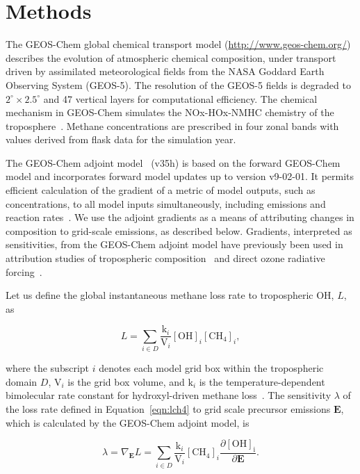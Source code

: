 \section{Methods}

The GEOS-Chem global chemical transport model (\url{http://www.geos-chem.org/}) describes the evolution of atmospheric chemical composition, under transport driven by assimilated meteorological fields from the NASA Goddard Earth Observing System (GEOS-5). The resolution of the GEOS-5 fields is degraded to $2^{\circ} \times 2.5^{\circ}$ and 47 vertical layers for computational efficiency. The chemical mechanism in GEOS-Chem simulates the NOx-HOx-NMHC chemistry of the troposphere~\citep{ref:mao2010}. Methane concentrations are prescribed in four zonal bands with values derived from flask data for the simulation year.

The GEOS-Chem adjoint model~\cite{ref:henze2007} (v35h) is based on the forward GEOS-Chem model and incorporates forward model updates up to version v9-02-01. It permits efficient calculation of the gradient of a metric of model outputs, such as concentrations, to all model inputs simultaneously, including emissions and reaction rates~\cite{ref:paulot2012}. We use the adjoint gradients as a means of attributing changes in composition to grid-scale emissions, as described below. Gradients, interpreted as sensitivities, from the GEOS-Chem adjoint model have previously been used in attribution studies of tropospheric composition~\citep{ref:zhang2009,ref:walker2012} and direct ozone radiative forcing~\citep{ref:bowman2012}.

Let us define the global instantaneous methane loss rate to tropospheric OH, $L$, as

\begin{equation}
L=\sum_{i \in D} \frac{\mathrm{k}_i}{\mathrm{V}_i} \mathrm{[OH]}_i \mathrm{[CH_4]}_i,
\label{eqn:lch4}
\end{equation}

where the subscript $i$ denotes each model grid box within the tropospheric domain $D$, $\mathrm{V}_i$ is the grid box volume, and $\mathrm{k}_i$ is the temperature-dependent bimolecular rate constant for hydroxyl-driven methane loss~\citep{ref:sander2011}. The sensitivity $\lambda$ of the loss rate defined in Equation~\ref{eqn:lch4} to grid scale precursor emissions $\mathbf{E}$, which is calculated by the GEOS-Chem adjoint model, is

\begin{equation}
\lambda = \nabla_\mathbf{E} L = \sum_{i \in D} \frac{\mathrm{k}_i}{\mathrm{V}_i} \mathrm{[CH_4]}_i \frac{\partial \mathrm{[OH]_i}}{\partial \mathbf{E}}.
\label{eqn:dlde}
\end{equation}

